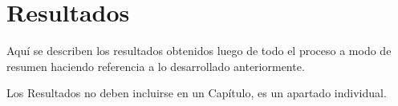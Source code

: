 \chapter{Resultados}

Aquí se describen los resultados obtenidos luego de todo el proceso a modo de resumen haciendo 
referencia a lo desarrollado anteriormente. 

Los Resultados no deben incluirse en un Capítulo, es un apartado individual.